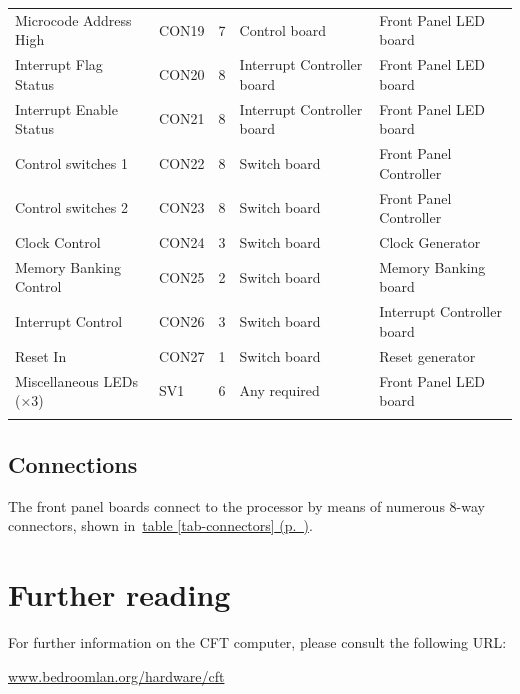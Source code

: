 \documentclass[11pt,a4paper,twocolumns]{article}
\newcommand{\cf}[2][section]{\hyperref[#2]{#1 \ref*{#2} (p.~\pageref*{#2})}}
\newcommand{\tcf}[1]{\cf[table]{#1}}
\newcommand\link[1]{\sf\href{http://#1}{#1}}
\begin{document}
\begin{table}[h!]
\begin{tabular}{llcll}
    Microcode Address High   & CON19 & 7 & Control board & Front Panel LED board \\
    Interrupt Flag Status    & CON20 & 8 & Interrupt Controller board & Front Panel LED board \\
    Interrupt Enable Status  & CON21 & 8 & Interrupt Controller board & Front Panel LED board \\
    Control switches 1       & CON22 & 8 & Switch board & Front Panel Controller \\
    Control switches 2       & CON23 & 8 & Switch board & Front Panel Controller \\
    Clock Control            & CON24 & 3 & Switch board & Clock Generator \\
    Memory Banking Control   & CON25 & 2 & Switch board & Memory Banking board \\
    Interrupt Control        & CON26 & 3 & Switch board & Interrupt Controller board \\
    Reset In                 & CON27 & 1 & Switch board & Reset generator \\
    Miscellaneous LEDs (×3)  & SV1   & 6 & Any required & Front Panel LED board \\
    \noalign{\smallskip}\hline\noalign{\smallskip}
  \end{tabular}
\end{table}


\subsection{Connections}

The front panel boards connect to the processor by means of numerous
8-way connectors, shown in~\tcf{tab-connectors}.

\section{Further reading}

For further information on the CFT computer, please consult the
following URL:

\begin{center}
\link{www.bedroomlan.org/hardware/cft}
\end{center}

\clearpage
\end{document}
